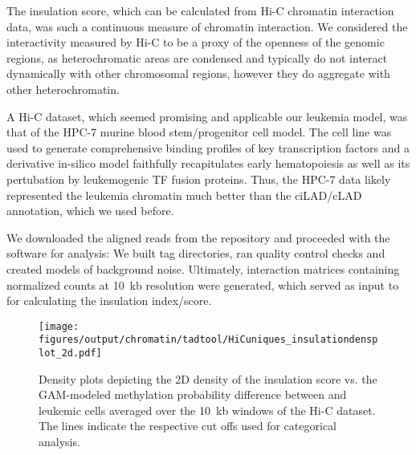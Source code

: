 The insulation score, which can be calculated from Hi-C chromatin interaction data\cite{Crane2015}, was such a continuous measure of chromatin interaction. We considered the interactivity measured by Hi-C to be a proxy of the openness of the genomic regions, as heterochromatic areas are condensed and typically do not interact dynamically with other chromosomal regions, however they do aggregate with other heterochromatin. 

A Hi-C dataset, which seemed promising and applicable our \mllafnine \kitpos leukemia model, was that of  the HPC-7 murine blood stem/progenitor cell model\cite{Wilson2016}. The cell line was used to generate comprehensive binding profiles of key transcription factors\cite{Wilson2010,Calero-Nieto2014} and a derivative in-silico model faithfully recapitulates early hematopoiesis as well as its pertubation by leukemogenic TF fusion proteins\cite{Schuette2016}. Thus, the HPC-7 data likely represented the \mllafnine leukemia chromatin much better than the ciLAD/cLAD annotation, which we used before. 

We downloaded the aligned reads from the  repository and proceeded with the software  for analysis: We built tag directories, ran quality control checks and created models of background noise. Ultimately, interaction matrices containing normalized counts at \SI{10}{\kilo b} resolution were generated, which served as input to \cite{Kruse2016} for calculating the insulation index/score\cite{Crane2015}.

\begin{figure}[!htb]
	\centering
	\texttt{[image: figures/output/chromatin/tadtool/HiCuniques\_insulationdensplot\_2d.pdf]}
	\caption{Density plots depicting the 2D density of the insulation score vs. the GAM-modeled methylation probability difference between \dnmtchip and \dnmtwt \kitpos leukemic cells averaged over the \SI{10}{\kilo b} windows of the Hi-C dataset. The lines indicate the respective cut offs used for categorical analysis.}
	\label{fig:HiCuniques_insulationdensplot}
\end{figure}

